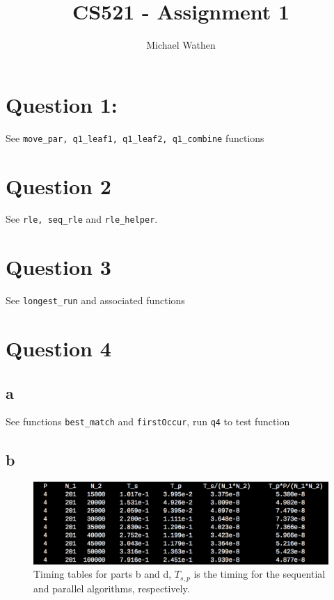\documentclass{article}
\begin{document}
\title{CS521 - Assignment 1}
\author{Michael Wathen}
\maketitle



\section*{Question 1:}

See {\tt move\_par, q1\_leaf1, q1\_leaf2, q1\_combine} functions

\section*{Question 2}

See {\tt rle, seq\_rle} and {\tt rle\_helper}.

\section*{Question 3}

See {\tt longest\_run} and associated functions


\section*{Question 4}


\subsection*{a}

See functions {\tt best\_match} and {\tt firstOccur}, run {\tt q4} to test function


\subsection*{b}

\begin{figure}[!ht]
  \centering
    \includegraphics[width=1\textwidth]{Timing}
  \caption{Timing tables for parts b and d, $T_{s,p}$ is the timing for the sequential and parallel algorithms, respectively.}
  \label{fig:timing}
\end{figure}
\end{document}
